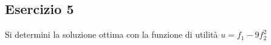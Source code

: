 \documentclass[\main/main.tex]{subfiles}
\begin{document}
\subsection{Esercizio 5}
Si determini la soluzione ottima con la funzione di utilità $u = f_1 - 9f_2^2$
\end{document}
